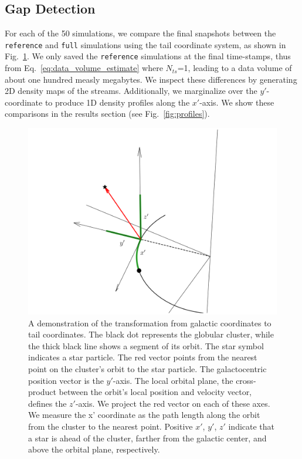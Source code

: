 \documentclass{aa}
\begin{document}



\begin{appendix}
  
  
  \section{Gap Detection} \label{sec:gap_detection}
    For each of the 50 simulations, we compare the final snapshots between the \texttt{reference} and \texttt{full} simulations using the tail coordinate system, as shown in Fig.~\ref{fig:TailCoordinates}. We only saved the \texttt{reference} simulations at the final time-stamps, thus from Eq.~\ref{eq:data_volume_estimate} where $N_{ts}$=1, leading to a data volume of about one hundred measly megabytes. We inspect these differences by generating 2D density maps of the streams. Additionally, we marginalize over the $y'$-coordinate to produce 1D density profiles along the $x'$-axis. We show these comparisons in the results section (see Fig.~\ref{fig:profiles}).
    \begin{figure}
      \centering
      \includegraphics[width=\linewidth]{tailcoordinates.png}
      \caption{A demonstration of the transformation from galactic coordinates to tail coordinates. The black dot represents the globular cluster, while the thick black line shows a segment of its orbit. The star symbol indicates a star particle. The red vector points from the nearest point on the cluster's orbit to the star particle. The galactocentric position vector is the $y'$-axis. The local orbital plane, the cross-product between the orbit's local position and velocity vector, defines the $z'$-axis. We project the red vector on each of these axes. We measure the x' coordinate as the path length along the orbit from the cluster to the nearest point. Positive $x'$, $y'$, $z'$ indicate that a star is ahead of the cluster, farther from the galactic center, and above the orbital plane, respectively.}
      \label{fig:TailCoordinates}
    \end{figure}
  

\end{appendix}
\end{document}
